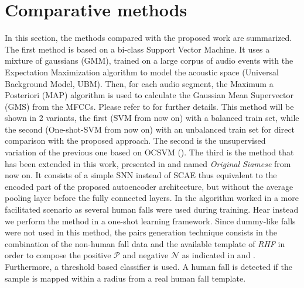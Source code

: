 \section{Comparative methods}
In this section, the methods compared with the proposed work are summarized.
The first method is based on a bi-class Support Vector Machine. It uses a mixture of gaussians (GMM), trained on a large corpus of audio events with the Expectation Maximization algorithm to model the acoustic space (Universal Background Model, UBM). Then, for each audio segment, the Maximum a Posteriori (MAP) algorithm is used to calculate the Gaussian Mean Supervector (GMS) from the MFCCs. Please refer to  for further details. This method will be shown in 2 variants, the first (SVM from now on) with a balanced train set, while the second (One-shot-SVM from now on) with an unbalanced train set for direct comparison with the proposed approach.
The second is the unsupervised variation of the previous one based on OCSVM ().
The third is the method that has been extended in this work, presented in  and named \textit{Original Siamese} from now on. It consists of a simple SNN instead of SCAE thus equivalent to the encoded part of the proposed autoencoder architecture, but without the average pooling layer before the fully connected layers. In  the algorithm worked in a more facilitated scenario as several human falls were used during training. Hear instead we perform the method in a one-shot learning framework. Since dummy-like falls were not used in this method, the pairs generation technique consists in the combination of the non-human fall data and the available template of \textit{RHF} in order to compose the positive $\mathcal{P}$ and negative $\mathcal{N}$ as indicated in  and . Furthermore, a threshold based classifier is used. A human fall is detected if the sample is mapped within a radius from a real human fall template.

